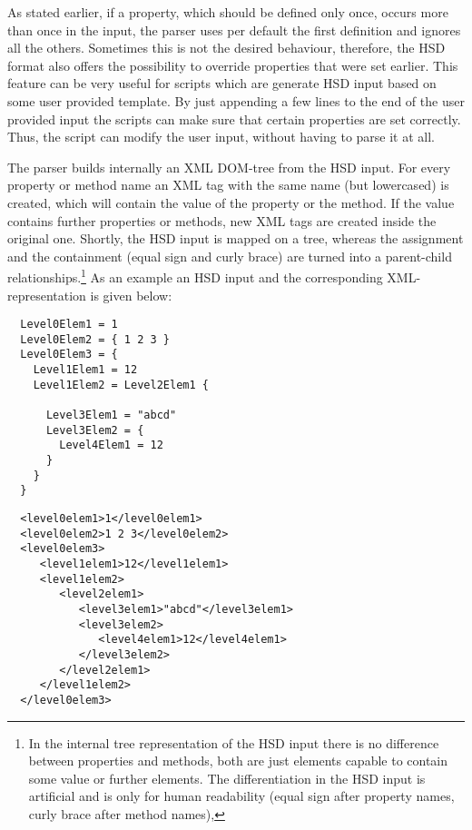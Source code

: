 As stated earlier, if a property, which should be defined only once,
occurs more than once in the input, the parser uses per default the
first definition and ignores all the others. Sometimes this is not the
desired behaviour, therefore, the HSD format also offers the
possibility to override properties that were set earlier.  This
feature can be very useful for scripts which are generate HSD input
based on some user provided template.  By just appending a few lines
to the end of the user provided input the scripts can make sure that
certain properties are set correctly. Thus, the script can modify the
user input, without having to parse it at all.

The parser builds internally an XML DOM-tree from the HSD input. For
every property or method name an XML tag with the same name (but
lowercased) is created, which will contain the value of the property
or the method. If the value contains further properties or methods,
new XML tags are created inside the original one. Shortly, the HSD
input is mapped on a tree, whereas the assignment and the containment
(equal sign and curly brace) are turned into a parent-child
relationships.\footnote{In the internal tree representation of the HSD
  input there is no difference between properties and methods, both
  are just elements capable to contain some value or further
  elements. The differentiation in the HSD input is artificial and is
  only for human readability (equal sign after property names, curly
  brace after method names),} As an example an HSD input and the
corresponding XML-representation is given below:

\begin{minipage}{1.0\linewidth}
  \begin{center}
    \begin{minipage}[t]{5.5cm}
\begin{verbatim}
  Level0Elem1 = 1
  Level0Elem2 = { 1 2 3 }
  Level0Elem3 = {
    Level1Elem1 = 12
    Level1Elem2 = Level2Elem1 {

      Level3Elem1 = "abcd"
      Level3Elem2 = {
        Level4Elem1 = 12
      }
    }
  }
\end{verbatim}
    \end{minipage}
    \hspace*{1cm}
    \begin{minipage}[t]{7.5cm}
\begin{verbatim}
  <level0elem1>1</level0elem1>
  <level0elem2>1 2 3</level0elem2>
  <level0elem3>
     <level1elem1>12</level1elem1>
     <level1elem2>
        <level2elem1>
           <level3elem1>"abcd"</level3elem1>
           <level3elem2>
              <level4elem1>12</level4elem1>
           </level3elem2>
        </level2elem1>
     </level1elem2>
  </level0elem3>
\end{verbatim}
    \end{minipage}
  \end{center}
\end{minipage}

